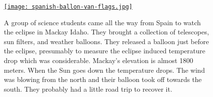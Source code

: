 
\begin{figure}[htbp]
\centering
\href{https://conceptcontrol.smugmug.com/Places/USA-and-Canada/Idaho-Instants/i-dGsRkQn/A}{\texttt{[image: spanish-ballon-van-flags.jpg]}}
\caption[A group of science students came all the way from Spain to watch the
eclipse in Mackay Idaho.]{A group of science students came all the way from Spain to watch the
eclipse in Mackay Idaho. They brought a collection of telescopes, sun
filters, and weather balloons. They released a balloon just before the
eclipse, presumably to measure the eclipse induced temperature drop
which was considerable. Mackay's elevation is almost 1800 meters. When
the Sun goes down the temperature drops. The wind was blowing from the
north and their balloon took off towards the south. They probably had a
little road trip to recover it.}
\label{fig:5340x4}
\end{figure}



